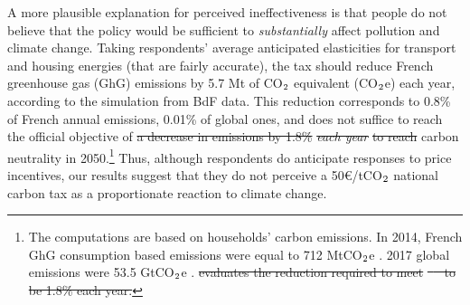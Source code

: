 \documentclass[12pt]{article} %
\providecommand{\DIFdeltex}[1]{{\protect\color{red}\sout{#1}}}                      %
\providecommand{\DIFdelbegin}{} %
\providecommand{\DIFdelend}{} %
\providecommand{\DIFdel}[1]{\texorpdfstring{\DIFdeltex{#1}}{}} %
\newcommand{\DIFscaledelfig}{0.5}
\newlength{\DIFdelgraphicswidth} %
\newlength{\DIFdelgraphicsheight} %
\newcommand{\DIFdelincludegraphics}[2][]{%
\sbox{\DIFdelgraphicsbox}{\DIFOincludegraphics[#1]{#2}}%
\settoboxwidth{\DIFdelgraphicswidth}{\DIFdelgraphicsbox} %
\settoboxtotalheight{\DIFdelgraphicsheight}{\DIFdelgraphicsbox} %
\scalebox{\DIFscaledelfig}{%
\parbox[b]{\DIFdelgraphicswidth}{\usebox{\DIFdelgraphicsbox}\\[-\baselineskip] \rule{\DIFdelgraphicswidth}{0em}}\llap{\resizebox{\DIFdelgraphicswidth}{\DIFdelgraphicsheight}{%
\setlength{\unitlength}{\DIFdelgraphicswidth}%
\begin{picture}(1,1)%
\thicklines\linethickness{2pt} %
{\color[rgb]{1,0,0}\put(0,0){\framebox(1,1){}}}%
{\color[rgb]{1,0,0}\put(0,0){\line( 1,1){1}}}%
{\color[rgb]{1,0,0}\put(0,1){\line(1,-1){1}}}%
\end{picture}%
}\hspace*{3pt}}} %
} %
\DeclareRobustCommand{\DIFdelbegin}{\DIFOdelbegin \let\includegraphics\DIFdelincludegraphics} %
\DeclareRobustCommand{\DIFdelend}{\DIFOaddend \let\includegraphics\DIFOincludegraphics} %
\begin{document}

A more plausible explanation for perceived ineffectiveness is that people do not believe that the policy would be sufficient to \textit{substantially} affect pollution and climate change. Taking respondents' average anticipated elasticities for transport and housing energies (that are fairly accurate), the tax should reduce French greenhouse gas (GhG) emissions by 5.7 Mt of CO$_\textnormal{2}$ equivalent (CO$_\textnormal{2}$e) each year, according to the simulation from BdF data. This reduction corresponds to 0.8\% of French annual emissions, 0.01\% of global ones, and does not suffice to reach the official objective of \DIFdelbegin \DIFdel{a decrease in emissions by 1.8\% }\textit{\DIFdel{each year}} %
\DIFdel{to reach }\DIFdelend carbon neutrality in 2050.\footnote{The computations are based on households' carbon emissions. In 2014, French GhG consumption based emissions were equal to 712 MtCO$_\textnormal{2}$e \citep{cgdd_chiffres_2019}. 2017 global emissions were 53.5 GtCO$_\textnormal{2}$e \citep{unep_emissions_2018}.\DIFdelbegin %
\DIFdel{evaluates the reduction required to meet }%
\DIFdel{\mbox{%
\citep{ministry_of_ecology_france_2015} }\hspace{0pt}%
to be 1.8\% each year.}\DIFdelend } Thus, although respondents do anticipate responses to price incentives, our results suggest that they do not perceive a 50\euro/tCO$_\textnormal{2}$ national carbon tax as a proportionate reaction to climate change. 
\end{document}
